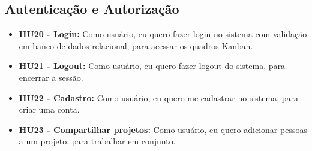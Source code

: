 \subsection{Autenticação e Autorização}
\begin{itemize}
    \item \textbf{HU20 - Login:} Como usuário, eu quero fazer login no sistema com validação em banco de dados relacional, para 
    acessar os quadros Kanban.
    \item \textbf{HU21 - Logout:} Como usuário, eu quero fazer logout do sistema, para 
    encerrar a sessão.
    \item \textbf{HU22 - Cadastro:} Como usuário, eu quero me cadastrar no sistema, para 
    criar uma conta.
    \item \textbf{HU23 - Compartilhar projetos:} Como usuário, eu quero adicionar pessoas a um projeto, para 
    trabalhar em conjunto.
\end{itemize}
